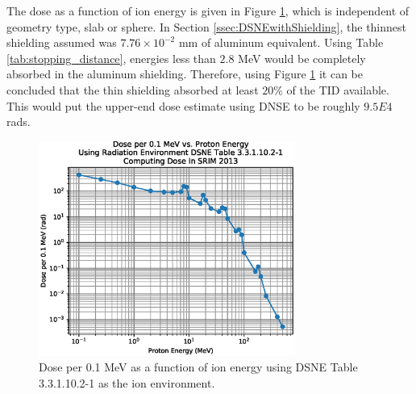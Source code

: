 \documentclass{hitec}
\begin{document}
The dose as a function of ion energy is given in Figure \ref{fig:Dose_vs_IonEnergy}, which is independent of geometry type, slab or sphere. In Section \ref{ssec:DSNEwithShielding}, the thinnest shielding assumed was $7.76\times 10^{-2}$ mm of aluminum equivalent. Using Table \ref{tab:stopping_distance}, energies less than $2.8$ MeV would be completely absorbed in the aluminum shielding. Therefore, using Figure \ref{fig:Dose_vs_IonEnergy} it can be concluded that the thin shielding absorbed at least $20\%$ of the TID available. This would put the upper-end dose estimate using DNSE to be roughly $9.5E4$ rads.

\begin{figure}[h!]
	\centering
	\includegraphics[width=0.75\textwidth]{Dose_vs_IonEnergy.eps}
	\caption{Dose per 0.1 MeV as a function of ion energy using DSNE Table 3.3.1.10.2-1 as the ion environment.}\label{fig:Dose_vs_IonEnergy}
\end{figure}
\end{document}
